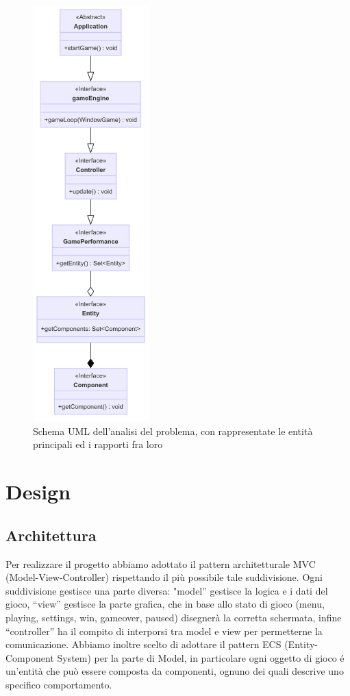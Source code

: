 \documentclass[a4paper,12pt]{report}
\begin{document}
\begin{figure}[H]
\includegraphics[width=0.4\textwidth]{img/analisi.png} 
\centering{}
\caption{Schema UML dell'analisi del problema, con rappresentate le entità principali ed i rapporti fra loro}
\label{img:analisi}
\end{figure}

\chapter{Design}

\section{Architettura}
Per realizzare il progetto abbiamo adottato il pattern architetturale MVC (Model-View-Controller) rispettando il più possibile tale suddivisione. 
Ogni suddivisione gestisce una parte diversa: "model” gestisce la logica e i dati del gioco, “view” gestisce la parte grafica, che in base allo stato di gioco (menu, playing, settings, win, gameover, paused) disegnerà la corretta schermata, infine “controller” ha il compito di interporsi tra model e view per permetterne la comunicazione. 
Abbiamo inoltre scelto di adottare il pattern ECS (Entity-Component System) per la parte di Model, in particolare ogni oggetto di gioco é un’entità che può essere composta da componenti, ognuno dei quali descrive uno specifico comportamento. 
\end{document}
